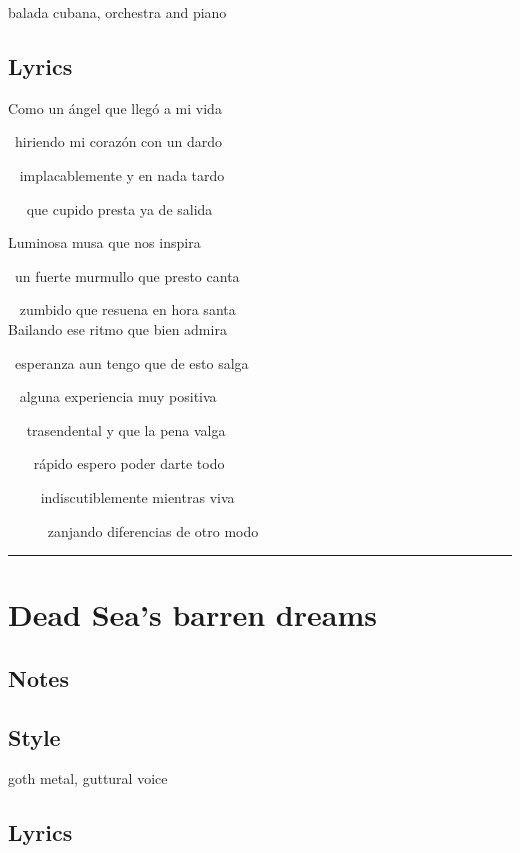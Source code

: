 \documentclass[]{article}
\begin{document}
balada cubana, orchestra and piano

\subsection{Lyrics}\label{lyrics-2}

Como un ángel que llegó a mi vida\\
\strut ~hiriendo mi corazón con un dardo\\
\strut ~ implacablemente y en nada tardo\\
\strut ~~ que cupido presta ya de salida

Luminosa musa que nos inspira\\
\strut ~un fuerte murmullo que presto canta\\
\strut ~ zumbido que resuena en hora santa~\\
Bailando ese ritmo que bien admira

~esperanza aun tengo que de esto salga\\
\strut ~ alguna experiencia muy positiva\\
\strut ~~ trasendental y que la pena valga

~~~ rápido espero poder darte todo\\
\strut ~~~~ indiscutiblemente mientras viva\\
\strut ~~~~~ zanjando diferencias de otro modo

\begin{center}\rule{0.5\linewidth}{0.5pt}\end{center}

\section{Dead Sea's barren dreams}\label{dead-seas-barren-dreams}

\subsection{Notes}\label{notes-3}

\subsection{Style}\label{style-3}

goth metal, guttural voice

\subsection{Lyrics}\label{lyrics-3}
\end{document}
